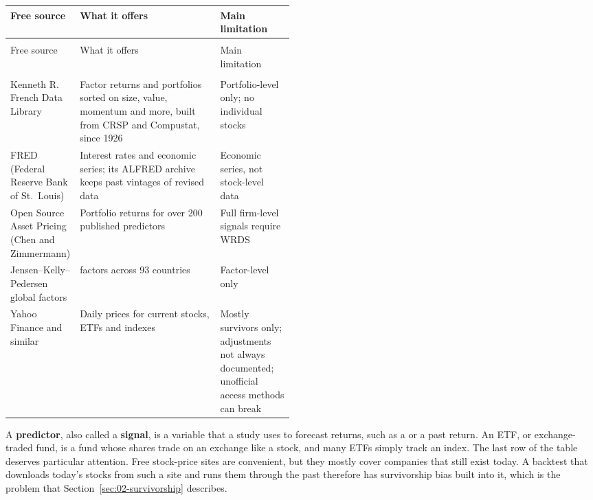 \begingroup
\small
\setlength{\LTpre}{6pt}\setlength{\LTpost}{6pt}
\begin{longtable}{@{}>{\raggedright\arraybackslash}p{0.22\linewidth}>{\raggedright\arraybackslash}p{}>{\raggedright\arraybackslash}p{0.26\linewidth}@{}}
\toprule
Free source & What it offers & Main limitation \\
\midrule
\endfirsthead
\multicolumn{3}{@{}l}{\emph{(continued)}} \\
\toprule
Free source & What it offers & Main limitation \\
\midrule
\endhead
\midrule
\multicolumn{3}{r@{}}{\emph{(continued on the next page)}} \\
\endfoot
\bottomrule
\endlastfoot
Kenneth R. French Data Library & Factor returns and portfolios sorted on size, value, momentum and more, built from CRSP and Compustat, since 1926 & Portfolio-level only; no individual stocks \\*
FRED (Federal Reserve Bank of St.\ Louis) & Interest rates and economic series; its ALFRED archive keeps past vintages of revised data & Economic series, not stock-level data \\
Open Source Asset Pricing (Chen and Zimmermann) & Portfolio returns for over 200 published predictors & Full firm-level signals require WRDS \\
Jensen--Kelly--Pedersen global factors & 153 factors across 93 countries & Factor-level only \\*
Yahoo Finance and similar & Daily prices for current stocks, ETFs and indexes & Mostly survivors only; adjustments not always documented; unofficial access methods can break \\
\end{longtable}
\addtocounter{table}{-1}%
\endgroup

A \textbf{predictor}, also called a \textbf{signal}, is a variable that a study uses to forecast returns, such as a  or a past return. An ETF, or exchange-traded fund, is a fund whose shares trade on an exchange like a stock, and many ETFs simply track an index. The last row of the table deserves particular attention. Free stock-price sites are convenient, but they mostly cover companies that still exist today. A backtest that downloads today's stocks from such a site and runs them through the past therefore has survivorship bias built into it, which is the problem that Section~\ref{sec:02-survivorship} describes.

